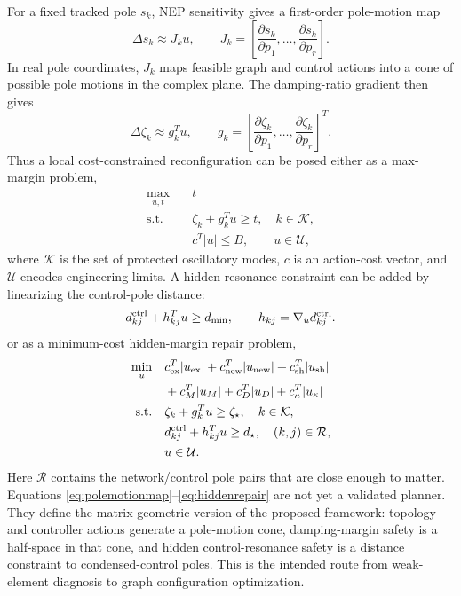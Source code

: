 \documentclass[journal]{IEEEtran}
\begin{document}
For a fixed tracked pole $s_k$, NEP sensitivity gives a first-order pole-motion map
\begin{equation}
\Delta s_k\approx J_k u,\qquad
J_k=\left[\frac{\partial s_k}{\partial p_1},\ldots,
\frac{\partial s_k}{\partial p_r}\right].
\label{eq:polemotionmap}
\end{equation}
In real pole coordinates, $J_k$ maps feasible graph and control actions into a cone of possible pole motions in the complex plane. The damping-ratio gradient then gives
\begin{equation}
\Delta\zeta_k\approx g_k^T u,\qquad
g_k=\left[\frac{\partial\zeta_k}{\partial p_1},\ldots,
\frac{\partial\zeta_k}{\partial p_r}\right]^T .
\end{equation}
Thus a local cost-constrained reconfiguration can be posed either as a max-margin problem,
\begin{align}
\max_{u,t}\quad & t\\
\text{s.t.}\quad &
\zeta_k+g_k^Tu\ge t,\quad k\in\mathcal{K},\nonumber\\
& c^T|u|\le B,\qquad u\in\mathcal{U},
\label{eq:reconfiglp}
\end{align}
where $\mathcal{K}$ is the set of protected oscillatory modes, $c$ is an action-cost vector, and $\mathcal{U}$ encodes engineering limits. A hidden-resonance constraint can be added by linearizing the control-pole distance:
\begin{equation}
d_{kj}^{\rm ctrl}+h_{kj}^Tu\ge d_{\min},
\qquad
h_{kj}=\nabla_u d_{kj}^{\rm ctrl}.
\label{eq:hiddenconstraint}
\end{equation}
or as a minimum-cost hidden-margin repair problem,
\begin{align}
\min_{u}\quad &
c_{\rm ex}^T|u_{\rm ex}|+
c_{\rm new}^T|u_{\rm new}|+
c_{\rm sh}^T|u_{\rm sh}|
\nonumber\\
&+
c_M^T|u_M|+
c_D^T|u_D|+
c_\kappa^T|u_\kappa|
\nonumber\\
\text{s.t.}\quad &
\zeta_k+g_k^Tu\ge \zeta_\star,\quad k\in\mathcal{K},
\nonumber\\
&
d_{kj}^{\rm ctrl}+h_{kj}^Tu\ge d_\star,\quad
(k,j)\in\mathcal{R},
\nonumber\\
& u\in\mathcal{U}.
\label{eq:hiddenrepair}
\end{align}
Here $\mathcal{R}$ contains the network/control pole pairs that are close enough to matter. Equations \eqref{eq:polemotionmap}--\eqref{eq:hiddenrepair} are not yet a validated planner. They define the matrix-geometric version of the proposed framework: topology and controller actions generate a pole-motion cone, damping-margin safety is a half-space in that cone, and hidden control-resonance safety is a distance constraint to condensed-control poles. This is the intended route from weak-element diagnosis to graph configuration optimization.
\end{document}
